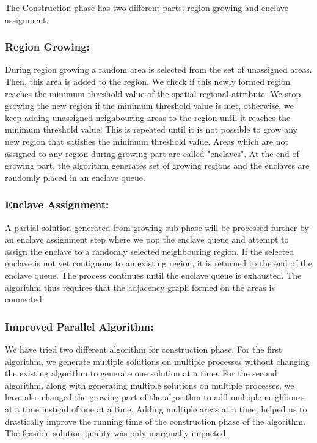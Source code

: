 \documentclass[conference]{IEEEtran}
\begin{document}
The Construction phase has two different parts: region growing and enclave
assignment.

\subsubsection*{Region Growing: }During region growing a random area is selected from the set of unassigned
areas. Then, this area is added to the region. We check if this newly
formed region reaches the minimum threshold value of the spatial regional attribute.
We stop growing the new region if the minimum threshold value is met, otherwise, we
keep adding unassigned neighbouring areas to the region until it reaches the
minimum threshold value. This is repeated until it is not possible to grow any
new region that satisfies the minimum threshold value. Areas which are not assigned
to any region during growing part are called "enclaves". At the end of growing
part, the algorithm generates set of growing regions and the enclaves are
randomly placed in an enclave queue.

\subsubsection*{Enclave Assignment: }A partial solution generated from growing sub-phase will be processed further by
an enclave assignment step where we pop the enclave queue and attempt to assign
the enclave to a randomly selected neighbouring region. If the selected enclave
is not yet contiguous to an existing region, it is returned to the end of the enclave
queue. The process continues until the enclave queue is exhausted. The algorithm
thus requires that the adjacency graph formed on the areas is connected.

\subsubsection*{Improved Parallel Algorithm: }We have tried two different algorithm for construction phase. For the first algorithm, we generate multiple solutions on multiple processes without changing the existing algorithm to generate one solution at a time. For the second algorithm, along with generating multiple solutions on multiple processes, we have also changed the growing part of the algorithm to add multiple neighbours at a time instead of one at a time. Adding multiple areas at a time, helped us to drastically improve the running time of the construction phase of the algorithm. The feasible solution quality was only marginally impacted.
\end{document}
